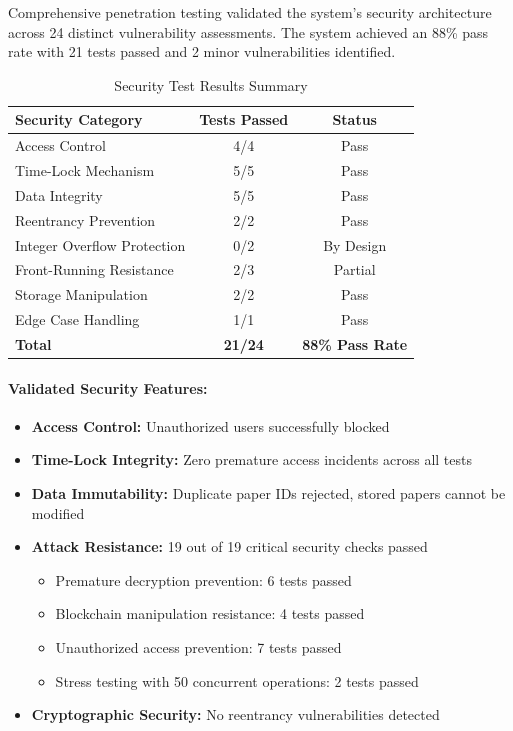 \documentclass[12pt,a4paper]{article}
\begin{document}
Comprehensive penetration testing validated the system's security architecture across 24 distinct vulnerability assessments. The system achieved an 88\% pass rate with 21 tests passed and 2 minor vulnerabilities identified.

\begin{table}[H]
\centering
\caption{Security Test Results Summary}
\label{tab:security-summary}
\begin{tabular}{lcc}
\toprule
\textbf{Security Category} & \textbf{Tests Passed} & \textbf{Status} \\
\midrule
Access Control & 4/4 & Pass \\
Time-Lock Mechanism & 5/5 & Pass \\
Data Integrity & 5/5 & Pass \\
Reentrancy Prevention & 2/2 & Pass \\
Integer Overflow Protection & 0/2 & By Design \\
Front-Running Resistance & 2/3 & Partial \\
Storage Manipulation & 2/2 & Pass \\
Edge Case Handling & 1/1 & Pass \\
\midrule
\textbf{Total} & \textbf{21/24} & \textbf{88\% Pass Rate} \\
\bottomrule
\end{tabular}
\end{table}

\paragraph{Validated Security Features:}
\begin{itemize}
    \item \textbf{Access Control:} Unauthorized users successfully blocked
    \item \textbf{Time-Lock Integrity:} Zero premature access incidents across all tests
    \item \textbf{Data Immutability:} Duplicate paper IDs rejected, stored papers cannot be modified
    \item \textbf{Attack Resistance:} 19 out of 19 critical security checks passed
    \begin{itemize}
        \item Premature decryption prevention: 6 tests passed
        \item Blockchain manipulation resistance: 4 tests passed
        \item Unauthorized access prevention: 7 tests passed
        \item Stress testing with 50 concurrent operations: 2 tests passed
    \end{itemize}
    \item \textbf{Cryptographic Security:} No reentrancy vulnerabilities detected
\end{itemize}
\end{document}
